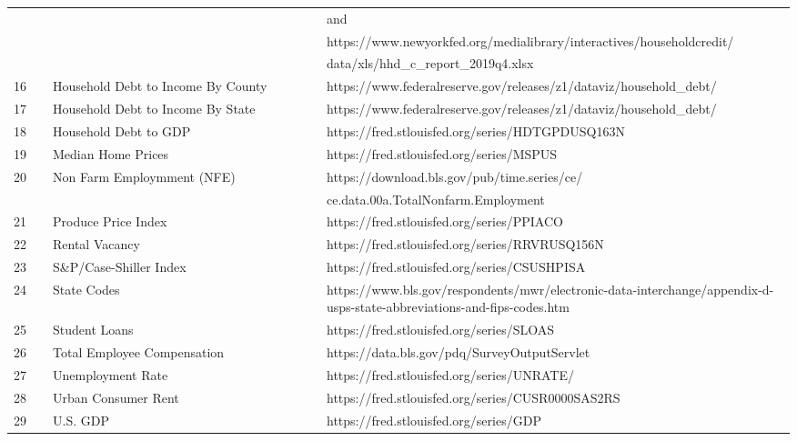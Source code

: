 \documentclass[sigconf,nonacm,11pt]{acmart}
\begin{document}
\begin{appendix}
\begin{table}[ht]
\begin{tabular}{p{0.05\linewidth}p{0.35\linewidth}p{0.6\linewidth}}
 & & and\\
 & & https://www.newyorkfed.org/medialibrary/interactives/householdcredit/\\
 & & data/xls/hhd\_c\_report\_2019q4.xlsx\\
16 & Household Debt to Income By County & https://www.federalreserve.gov/releases/z1/dataviz/household\_debt/\\
17 & Household Debt to Income By State  & https://www.federalreserve.gov/releases/z1/dataviz/household\_debt/\\
18 & Household Debt to GDP & https://fred.stlouisfed.org/series/HDTGPDUSQ163N\\
19 & Median Home Prices & https://fred.stlouisfed.org/series/MSPUS\\
20 & Non Farm Employmment (NFE) & https://download.bls.gov/pub/time.series/ce/\\
 & & ce.data.00a.TotalNonfarm.Employment\\
21 & Produce Price Index  & https://fred.stlouisfed.org/series/PPIACO\\
22 & Rental Vacancy & https://fred.stlouisfed.org/series/RRVRUSQ156N\\
23 & S\&P/Case-Shiller Index & https://fred.stlouisfed.org/series/CSUSHPISA\\
24 & State Codes & https://www.bls.gov/respondents/mwr/electronic-data-interchange/appendix-d-usps-state-abbreviations-and-fips-codes.htm\\
25 & Student Loans & https://fred.stlouisfed.org/series/SLOAS\\
26 & Total Employee Compensation & https://data.bls.gov/pdq/SurveyOutputServlet\\
27 & Unemployment Rate & https://fred.stlouisfed.org/series/UNRATE/\\
28 & Urban Consumer Rent & https://fred.stlouisfed.org/series/CUSR0000SAS2RS\\
29 & U.S. GDP  & https://fred.stlouisfed.org/series/GDP\\
\hline
\end{tabular}
\end{table}





\end{appendix}
\end{document}
